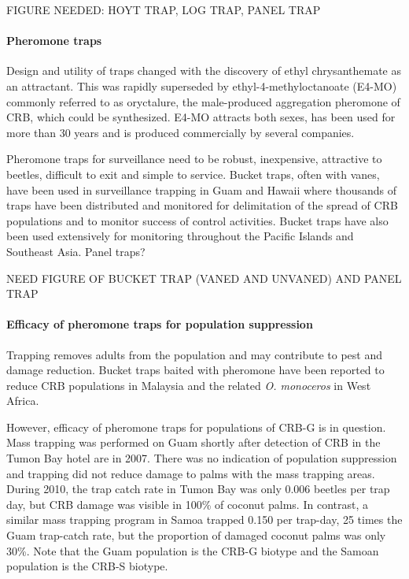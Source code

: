 \documentclass[twocolumn,letterpaper]{scrartcl}
\begin{document}
FIGURE NEEDED: HOYT TRAP, LOG TRAP, PANEL TRAP

\paragraph{Pheromone traps} Design and utility of traps changed with the discovery of ethyl chrysanthemate as an attractant. This was rapidly superseded by ethyl-4-methyloctanoate (E4-MO) commonly referred to as oryctalure, the male-produced aggregation pheromone of CRB, which could be synthesized. E4-MO attracts both sexes, has been used for more than 30 years and is produced commercially by several companies. 

Pheromone traps for surveillance need to be robust, inexpensive, attractive to beetles, difficult to exit and simple to service. Bucket traps, often with vanes, have been used in surveillance trapping in Guam and Hawaii where thousands of traps have been distributed and monitored for delimitation of the spread of CRB populations and to monitor success of control activities. Bucket traps have also been used extensively for monitoring throughout the Pacific Islands and Southeast Asia. Panel traps?

NEED FIGURE OF BUCKET TRAP (VANED AND UNVANED) AND PANEL TRAP


\paragraph{Efficacy of pheromone traps for population suppression} Trapping removes adults from the population and may contribute to pest and damage reduction. Bucket traps baited with pheromone have been reported to reduce CRB populations in Malaysia and the related \textit{O. monoceros} in West Africa. 

However, efficacy of pheromone traps for populations of CRB-G is in question.
Mass trapping was performed on Guam shortly after detection of CRB in the Tumon Bay hotel are in 2007. There was no indication of population suppression and trapping did not reduce damage to palms with the mass trapping areas. During 2010, the trap catch rate in Tumon Bay was only 0.006 beetles per trap day, but CRB damage was visible in 100\% of coconut palms. In contrast, a similar mass trapping program in Samoa trapped 0.150 per trap-day, 25 times the Guam trap-catch rate, but the proportion of damaged coconut palms was only 30\%. Note that the Guam population is the CRB-G biotype and the Samoan population is the CRB-S biotype. 
\end{document}
